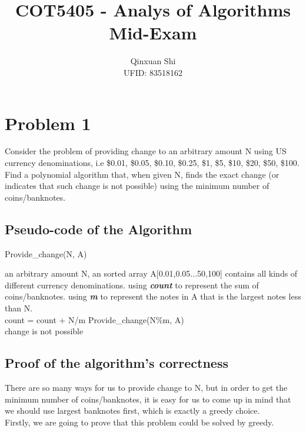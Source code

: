 \documentclass[]{article}
\title{\Huge COT5405 - Analys of Algorithms \\ Mid-Exam}
\author{Qinxuan Shi \\ UFID: 83518162}
\date{}
\begin{document}
	
	\maketitle
	\clearpage
	
	\section{Problem 1}
	Consider the problem of providing change to an arbitrary amount N using US currency denominations, i.e \$0.01, \$0.05, \$0.10, \$0.25, \$1, \$5, \$10, \$20, \$50, \$100. Find a polynomial algorithm that, when given N, finds the exact change (or indicates that such change is not possible) using the minimum number of coins/banknotes.
	
	\subsection{Pseudo-code of the Algorithm}
	\begin{algorithm}  
		\caption{Provide\_change(N, A)}  
		\begin{algorithmic} 
			\Require an arbitrary amount N, an sorted array A[0.01,0.05...50,100] contains all kinds of different currency denominations.  
			\Ensure
			\State using \emph{\textbf{count}} to represent the sum of coins/banknotes.
			\State using \emph{\textbf{m}} to represent the notes in A that is the largest notes less than N. \\
			
			\State count = count + N/m
			\State Provide\_change(N\%m, A) \\
				\State change is not possible
			\EndIf
		\end{algorithmic}  
	\end{algorithm} 
	
	\subsection{Proof of the algorithm's correctness}
	
	There are so many ways for us to provide change to N, but in order to get the minimum number of coins/banknotes, it is easy for us to come up in mind that we should use largest banknotes first, which is exactly a greedy choice. \\
	
	\noindent Firstly, we are going to prove that this problem could be solved by greedy. \\
	
\end{document}
